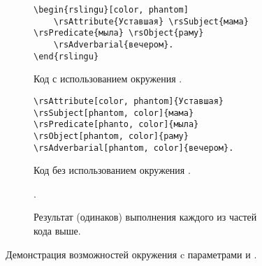 \begin{figure}[htp!]
    \centering
    \begin{subfigure}{\textwidth}
        \begin{verbatim}
\begin{rslingu}[color, phantom]
    \rsAttribute{Уставшая} \rsSubject{мама} \rsPredicate{мыла} \rsObject{раму}
    \rsAdverbarial{вечером}.
\end{rslingu}
        \end{verbatim}
    \caption{Код с использованием окружения .}
    \end{subfigure}\vspace*{.75cm}
    \begin{subfigure}{\textwidth}
        \begin{verbatim}
\rsAttribute[color, phantom]{Уставшая} \rsSubject[phantom, color]{мама}
\rsPredicate[phanto, color]{мыла} \rsObject[phantom, color]{раму}
\rsAdverbarial[phantom, color]{вечером}.
        \end{verbatim}
    \caption{Код без использованием окружения .}
    \end{subfigure}\vspace*{.75cm}
    \begin{subfigure}{.9\textwidth}
        \centering
        \begin{rslingu}
                .
        \end{rslingu}
    \caption{Результат (одинаков) выполнения каждого из частей кода выше.}
    \end{subfigure}
    \caption{Демонстрация возможностей окружения  c параметрами и .}
\end{figure}
